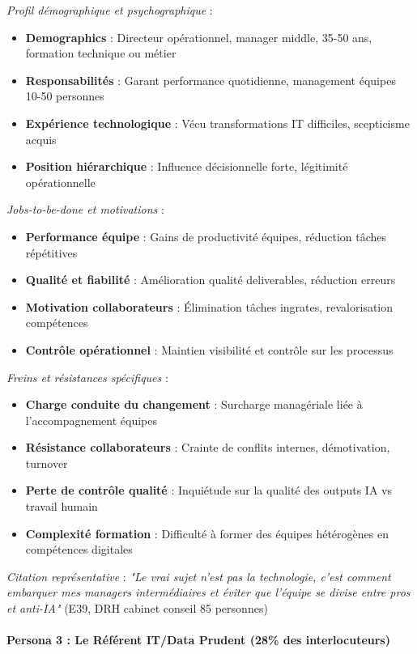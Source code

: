 \emph{Profil démographique et psychographique} :
\begin{itemize}
    \item \textbf{Demographics} : Directeur opérationnel, manager middle, 35-50 ans, formation technique ou métier
    \item \textbf{Responsabilités} : Garant performance quotidienne, management équipes 10-50 personnes
    \item \textbf{Expérience technologique} : Vécu transformations IT difficiles, scepticisme acquis
    \item \textbf{Position hiérarchique} : Influence décisionnelle forte, légitimité opérationnelle
\end{itemize}
\medskip
\emph{Jobs-to-be-done et motivations} :
\begin{itemize}
    \item \textbf{Performance équipe} : Gains de productivité équipes, réduction tâches répétitives
    \item \textbf{Qualité et fiabilité} : Amélioration qualité deliverables, réduction erreurs
    \item \textbf{Motivation collaborateurs} : Élimination tâches ingrates, revalorisation compétences
    \item \textbf{Contrôle opérationnel} : Maintien visibilité et contrôle sur les processus
\end{itemize}
\medskip
\emph{Freins et résistances spécifiques} :
\begin{itemize}
    \item \textbf{Charge conduite du changement} : Surcharge managériale liée à l'accompagnement équipes
    \item \textbf{Résistance collaborateurs} : Crainte de conflits internes, démotivation, turnover
    \item \textbf{Perte de contrôle qualité} : Inquiétude sur la qualité des outputs IA vs travail humain
    \item \textbf{Complexité formation} : Difficulté à former des équipes hétérogènes en compétences digitales
\end{itemize}
\medskip
\emph{Citation représentative} : \emph{"Le vrai sujet n'est pas la technologie, c'est comment embarquer mes managers intermédiaires et éviter que l'équipe se divise entre pros et anti-IA"} (E39, DRH cabinet conseil 85 personnes)
\\\\
\textbf{Persona 3 : Le Référent IT/Data Prudent (28\% des interlocuteurs)}\\
